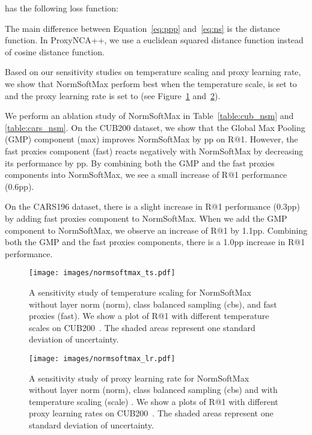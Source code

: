 \documentclass[runningheads]{llncs}
\begin{document}
 has the following loss function:



The main difference between Equation~\ref{eq:ppp} and~\ref{eq:ns} is the distance function. In ProxyNCA++, we use a euclidean squared distance function instead of cosine distance function. 

Based on our sensitivity studies on temperature scaling and proxy learning rate, we show that NormSoftMax perform best when the temperature scale,  is set to  and the proxy learning rate is set to  (see Figure~\ref{fig:n_ts} and~\ref{fig:n_l}).

We perform an ablation study of NormSoftMax in Table~\ref{table:cub_nsm} and \ref{table:cars_nsm}. On the CUB200 dataset, we show that the Global Max Pooling (GMP) component (max) improves NormSoftMax by pp on R@1. However, the fast proxies component (fast) reacts negatively with NormSoftMax by decreasing its performance by pp. By combining both the GMP and the fast proxies components into NormSoftMax, we see a small increase of R@1 performance (0.6pp).


On the CARS196 dataset, there is a slight increase in R@1 performance (0.3pp) by adding fast proxies component to NormSoftMax. When we add the GMP component to NormSoftMax, we observe an increase of R@1 by 1.1pp. Combining both the GMP and the fast proxies components, there is a 1.0pp increase in R@1 performance.



\begin{figure}
  \centering
  \caption{A sensitivity study of temperature scaling for NormSoftMax~\cite{zhai2019} without layer norm (norm), class balanced sampling (cbs), and fast proxies (fast). We show a plot of R@1 with different temperature scales on CUB200~\cite{wah2011caltech}. The shaded areas represent one standard deviation of uncertainty. }
\texttt{[image: images/normsoftmax\_ts.pdf]}
  \label{fig:n_ts}
\end{figure}

\begin{figure}
  \centering
  \caption{A sensitivity study of proxy learning rate for NormSoftMax~\cite{zhai2019} without layer norm (norm), class balanced sampling (cbs) and with temperature scaling (scale) . We show a plots of R@1 with different  proxy learning rates on CUB200~\cite{wah2011caltech}. The shaded areas represent one standard deviation of uncertainty. }
\texttt{[image: images/normsoftmax\_lr.pdf]}
  \label{fig:n_l}
\end{figure}
\end{document}
